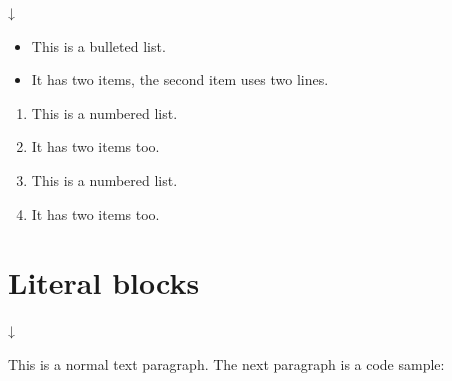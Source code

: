\documentclass[letterpaper,10pt,dvipdfmx,openany,oneside]{sphinxmanual}
\begin{document}
↓
\begin{itemize}
\item {} 
This is a bulleted list.

\item {} 
It has two items, the second
item uses two lines.

\end{itemize}
\begin{enumerate}
\item {} 
This is a numbered list.

\item {} 
It has two items too.

\item {} 
This is a numbered list.

\item {} 
It has two items too.

\end{enumerate}


\section{Literal blocks}
\label{\detokenize{1.chapter/basic_syntax:literal-blocks}}
%
\begin{sphinxVerbatim}[commandchars=\\\{\}]
            

          
       

       

      
\end{sphinxVerbatim}

↓

This is a normal text paragraph. The next paragraph is a code sample:

%
\begin{sphinxVerbatim}[commandchars=\\\{\}]
       
    

    
\end{sphinxVerbatim}
\end{document}
